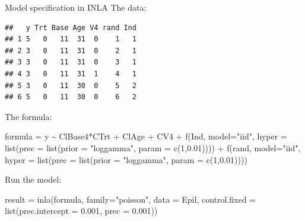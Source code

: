 \documentclass[
  handout]{beamer}
\newenvironment{Shaded}{\begin{snugshade}}{\end{snugshade}}
\newcommand{\AttributeTok}[1]{\textcolor[rgb]{0.77,0.63,0.00}{#1}}
\newcommand{\DecValTok}[1]{\textcolor[rgb]{0.00,0.00,0.81}{#1}}
\newcommand{\FloatTok}[1]{\textcolor[rgb]{0.00,0.00,0.81}{#1}}
\newcommand{\FunctionTok}[1]{\textcolor[rgb]{0.00,0.00,0.00}{#1}}
\newcommand{\NormalTok}[1]{#1}
\newcommand{\OtherTok}[1]{\textcolor[rgb]{0.56,0.35,0.01}{#1}}
\newcommand{\SpecialCharTok}[1]{\textcolor[rgb]{0.00,0.00,0.00}{#1}}
\newcommand{\StringTok}[1]{\textcolor[rgb]{0.31,0.60,0.02}{#1}}
\begin{document}
\begin{frame}[fragile]{Model specification in INLA}
\protect\hypertarget{model-specification-in-inla}{}
The data: \tiny

\begin{verbatim}
##   y Trt Base Age V4 rand Ind
## 1 5   0   11  31  0    1   1
## 2 3   0   11  31  0    2   1
## 3 3   0   11  31  0    3   1
## 4 3   0   11  31  1    4   1
## 5 3   0   11  30  0    5   2
## 6 5   0   11  30  0    6   2
\end{verbatim}

\normalsize

The formula: \footnotesize

\begin{Shaded}
\begin{Highlighting}[]
\NormalTok{formula }\OtherTok{=}\NormalTok{ y }\SpecialCharTok{\textasciitilde{}}\NormalTok{ ClBase4}\SpecialCharTok{*}\NormalTok{CTrt }\SpecialCharTok{+}\NormalTok{ ClAge }\SpecialCharTok{+}\NormalTok{ CV4 }\SpecialCharTok{+}
              \FunctionTok{f}\NormalTok{(Ind, }\AttributeTok{model=}\StringTok{"iid"}\NormalTok{,}
                 \AttributeTok{hyper =} \FunctionTok{list}\NormalTok{(}\AttributeTok{prec =} \FunctionTok{list}\NormalTok{(}\AttributeTok{prior =} \StringTok{"loggamma"}\NormalTok{,}
                 \AttributeTok{param =} \FunctionTok{c}\NormalTok{(}\DecValTok{1}\NormalTok{,}\FloatTok{0.01}\NormalTok{)))) }\SpecialCharTok{+}
              \FunctionTok{f}\NormalTok{(rand, }\AttributeTok{model=}\StringTok{"iid"}\NormalTok{,}
                \AttributeTok{hyper =} \FunctionTok{list}\NormalTok{(}\AttributeTok{prec =} \FunctionTok{list}\NormalTok{(}\AttributeTok{prior =} \StringTok{"loggamma"}\NormalTok{, }
                                         \AttributeTok{param =} \FunctionTok{c}\NormalTok{(}\DecValTok{1}\NormalTok{,}\FloatTok{0.01}\NormalTok{))))}
\end{Highlighting}
\end{Shaded}

\normalsize

Run the model: \footnotesize

\begin{Shaded}
\begin{Highlighting}[]
\NormalTok{result }\OtherTok{=} \FunctionTok{inla}\NormalTok{(formula, }\AttributeTok{family=}\StringTok{"poisson"}\NormalTok{, }\AttributeTok{data =}\NormalTok{ Epil,}
              \AttributeTok{control.fixed =} \FunctionTok{list}\NormalTok{(}\AttributeTok{prec.intercept =} \FloatTok{0.001}\NormalTok{,}
                                   \AttributeTok{prec =} \FloatTok{0.001}\NormalTok{))}
\end{Highlighting}
\end{Shaded}

\normalsize
\end{frame}
\end{document}
